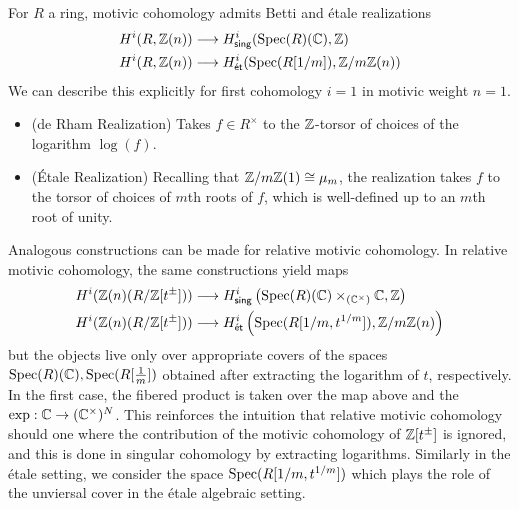 For $R$ a ring, motivic cohomology admits Betti and \'{e}tale realizations
\begin{align*}
    H^{i}(R,\mathbb{Z}(n))&\longrightarrow H^{i}_{\mathsf{sing}}(\operatorname{Spec}(R)(\mathbb{C}),\mathbb{Z}) \\
    H^{i}(R,\mathbb{Z}(n))&\longrightarrow H^{i}_{\mathsf{\acute{e}t}}(\operatorname{Spec}(R[1/m]),\mathbb{Z}/m\mathbb{Z}(n))
\end{align*}
We can describe this explicitly for first cohomology $i=1$ in motivic weight $n=1$. 
\begin{itemize}
    \item (de Rham Realization) Takes $f\in R^{\times}$ to the $\mathbb{Z}$-torsor of choices of the logarithm $\log(f)$. 
    \item (\'{E}tale Realization) Recalling that $\mathbb{Z}/m\mathbb{Z}(1)\cong\mu_{m}$, the realization takes $f$ to the torsor of choices of $m$th roots of $f$, which is well-defined up to an $m$th root of unity. 
\end{itemize}
Analogous constructions can be made for relative motivic cohomology. In relative motivic cohomology, the same constructions yield maps
\begin{align*}
    H^{i}(\mathbb{Z}(n)(R/\mathbb{Z}[t^{\pm}]))&\longrightarrow H^{i}_{\mathsf{sing}}\left(\operatorname{Spec}(R)(\mathbb{C})\times_{(\mathbb{C}^{\times})}\mathbb{C},\mathbb{Z}\right) \\
    H^{i}(\mathbb{Z}(n)(R/\mathbb{Z}[t^{\pm}]))&\longrightarrow H^{i}_{\mathsf{\acute{e}t}}\left(\operatorname{Spec}(R[1/m, t^{1/m}]),\mathbb{Z}/m\mathbb{Z}(n)\right)
\end{align*}
but the objects live only over appropriate covers of the spaces $\operatorname{Spec}(R)(\mathbb{C}),\operatorname{Spec}(R[\frac{1}{m}])$ obtained after extracting the logarithm of $t$, respectively. In the first case, the fibered product is taken over the map above and the $\exp:\mathbb{C}\to(\mathbb{C}^{\times})^{N}$. This reinforces the intuition that relative motivic cohomology should one where the contribution of the motivic cohomology of $\mathbb{Z}[t^{\pm}]$ is ignored, and this is done in singular cohomology by extracting logarithms. Similarly in the \'{e}tale setting, we consider the space $\operatorname{Spec}(R[1/m, t^{1/m}])$ which plays the role of the unviersal cover in the \'{e}tale algebraic setting. 

